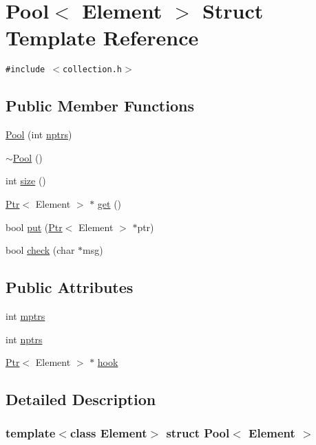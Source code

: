 \hypertarget{structPool}{
\section{Pool$<$ Element $>$ Struct Template Reference}
\label{structPool}
}
{\tt \#include $<$collection.h$>$}

\subsection*{Public Member Functions}
\begin{CompactItemize}
\item 
\hyperlink{structPool_cb28baa3e52a1256f3832f6888780580}{Pool} (int \hyperlink{structPool_1821fe943de779fbf3b69beae8e7a7b1}{nptrs})
\item 
\hyperlink{structPool_1c8a8beac7294a0076e6086c244b2f1c}{$\sim$Pool} ()
\item 
int \hyperlink{structPool_35eacf63cd8789880331d6a1e60e40d7}{size} ()
\item 
\hyperlink{structPtr}{Ptr}$<$ Element $>$ $\ast$ \hyperlink{structPool_46e44058b21fbfd2c6f613739993439b}{get} ()
\item 
bool \hyperlink{structPool_4c8f2bd60ea783e997286b8cc39d3e4f}{put} (\hyperlink{structPtr}{Ptr}$<$ Element $>$ $\ast$ptr)
\item 
bool \hyperlink{structPool_377972ba9ffbcf6574d611bc1d9be56b}{check} (char $\ast$msg)
\end{CompactItemize}
\subsection*{Public Attributes}
\begin{CompactItemize}
\item 
int \hyperlink{structPool_eaa0d991002928f9bd985fd15c8fb525}{mptrs}
\item 
int \hyperlink{structPool_1821fe943de779fbf3b69beae8e7a7b1}{nptrs}
\item 
\hyperlink{structPtr}{Ptr}$<$ Element $>$ $\ast$ \hyperlink{structPool_7d28b4715d9de0dbf13f8188e726a49f}{hook}
\end{CompactItemize}


\subsection{Detailed Description}
\subsubsection*{template$<$class Element$>$ struct Pool$<$ Element $>$}



